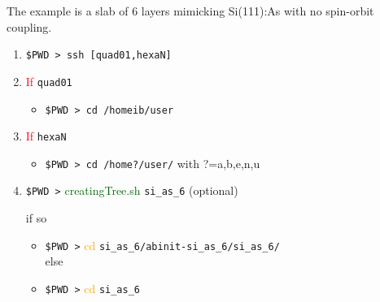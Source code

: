 \documentclass[openany,oneside]{book}
\numberwithin{equation}{section}
\begin{document}
The example is a slab of 6 layers mimicking Si(111):As with no spin-orbit
coupling. 
\begin{enumerate}
\item \verb=$PWD > ssh [quad01,hexaN]= 

\item\textcolor{red}{If} \verb=quad01= 
\begin{itemize}
\item \verb=$PWD > cd /homeib/user= 
\end{itemize}
\item\textcolor{red}{If} \verb=hexaN=
\begin{itemize}
\item \verb=$PWD > cd /home?/user/=  with ?=a,b,e,n,u 
\end{itemize}
\item 
\verb=$PWD >= \textcolor{darkgreen}{creatingTree.sh} \verb=si_as_6=
(optional)\\ \strut\hspace{.9cm}if so 
\begin{itemize}
\item \verb=$PWD >= \textcolor{orange}{cd} \verb=si_as_6/abinit-si_as_6/si_as_6/=\\else
\item \verb=$PWD >= \textcolor{orange}{cd} \verb=si_as_6=
\end{itemize}


\end{enumerate}
\end{document}
